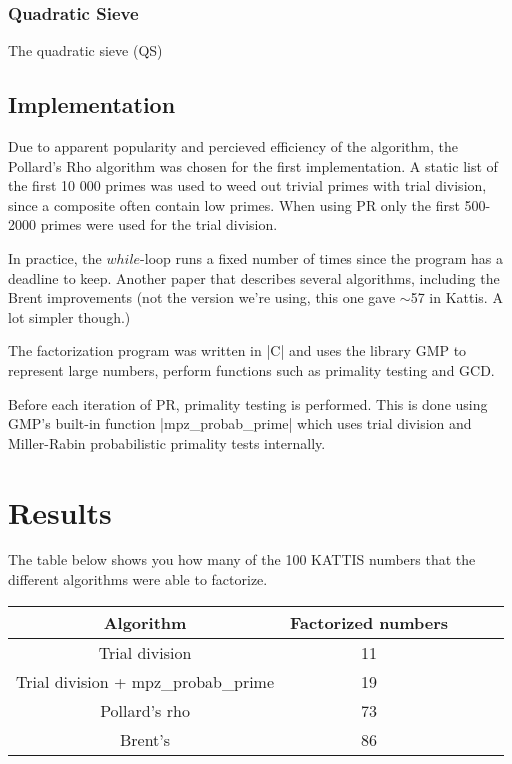 \documentclass[paper=a4, fontsize=11pt,numbers=endperiod]{scrartcl} %
\numberwithin{equation}{section} %
\numberwithin{figure}{section} %
\numberwithin{table}{section} %
\begin{document}
\subsubsection{Quadratic Sieve}
The quadratic sieve (QS) \cite{qsieve}

\subsection{Implementation}
Due to apparent popularity and percieved efficiency of the algorithm, the Pollard's Rho algorithm was chosen for the first implementation.
A static list of the first 10 000 primes was used to weed out trivial primes with trial division, since a composite often contain low primes.
When using PR only the first 500-2000 primes were used for the trial division.

In practice, the $while$-loop runs a fixed number of times since the program has a deadline to keep.
Another paper that describes several algorithms, including the Brent improvements (not the version we're using, this one gave $\sim$57 in Kattis. A lot simpler though.)\cite{otherpaper} %

The factorization program was written in |C| and uses the library GMP\cite{gmp} to represent large numbers, perform functions such as primality testing and GCD.

Before each iteration of PR, primality testing is performed. This is done using GMP's built-in function |mpz_probab_prime| which uses trial division and Miller-Rabin probabilistic primality tests internally.\cite{probabprime}



\section{Results}

The table below shows you how many of the 100 KATTIS numbers that the different algorithms were able to factorize.

    \begin{tabular}{|c|c|c|c|c|}
    \hline
    \textbf{Algorithm} & \textbf{Factorized numbers} \\ \hline
    Trial division & 11 \\ \hline
    Trial division + mpz\_probab\_prime & 19 \\ \hline
    Pollard's rho & 73 \\ \hline
    Brent's & 86 \\ \hline
    \end{tabular}
    \hspace{10pt}
\end{document}
